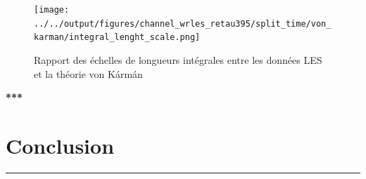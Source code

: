 \documentclass[12pt]{article}   %
\theoremstyle{plain}
\theoremstyle{remark}
\begin{document}
\begin{figure}[H]
	\begin{center}
		\texttt{[image: ../../output/figures/channel\_wrles\_retau395/split\_time/von\_karman/integral\_lenght\_scale.png]}
		\caption{Rapport des échelles de longueurs intégrales entre les données LES et la théorie von Kármán}
		\label{fig:vk_integral_scale}
	\end{center}
\end{figure}
	


\begin{center}
	\large \bf{***}
\end{center}

\vspace{0.3cm}
\section{Conclusion}
\noindent\rule{\linewidth}{2pt}
\vspace{0.1cm}
\end{document}
